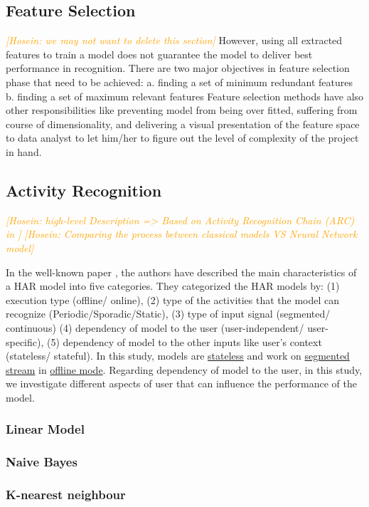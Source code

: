 \documentclass[journal,article,submit,moreauthors,pdftex]{Definitions/mdpi}
\newcommand{\hosein}[1]{\textcolor{orange}{{\it [Hosein: #1]}}}
\begin{document}
\subsection{Feature Selection}
\hosein{we may not want to delete this section}
However, using all extracted features to train a model does not guarantee the model to deliver best performance in recognition. There are two major objectives in feature selection phase that need to be achieved: 
a.	finding a set of minimum redundant features
b.	finding a set of maximum relevant features
Feature selection methods have also other responsibilities like preventing model from being over fitted, suffering from course of dimensionality, and delivering a visual presentation of the feature space to data analyst to let him/her to figure out the level of complexity of the project in hand. 

\subsection{Activity Recognition}
\hosein{high-level Description => Based on Activity Recognition Chain (ARC) in \cite{bulling2014tutorial}}
\hosein{Comparing the process between classical models VS Neural Network model}

In the well-known paper \cite{bulling2014tutorial}, the authors have described the main characteristics of a HAR model into five categories. They categorized the HAR models by: (1) execution type (offline/ online), (2) type of the activities that the model can recognize (Periodic/Sporadic/Static), (3) type of input signal (segmented/ continuous) (4) dependency of model to the user (user-independent/ user-specific), (5) dependency of model to the other inputs like user's context (stateless/ stateful).  In this study, models are \underline{stateless} and work on \underline{segmented stream} in \underline{offline mode}. Regarding dependency of model to the user, in this study, we investigate different aspects of user that can influence the performance of the model.\\

\subsubsection{Linear Model}
\subsubsection{Naive Bayes}
\subsubsection{K-nearest neighbour}
\end{document}
